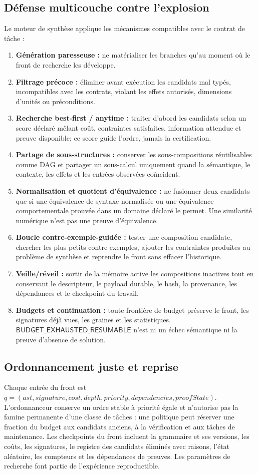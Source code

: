 \documentclass[11pt,a4paper]{article}
\theoremstyle{definition}
\theoremstyle{plain}
\theoremstyle{remark}
\begin{document}
\subsection{Défense multicouche contre l'explosion}
Le moteur de synthèse applique les mécanismes compatibles avec le contrat de tâche :
\begin{enumerate}
\item \textbf{Génération paresseuse :} ne matérialiser les branches qu'au moment où le front de recherche les développe.
\item \textbf{Filtrage précoce :} éliminer avant exécution les candidats mal typés, incompatibles avec les contrats, violant les effets autorisés, dimensions d'unités ou préconditions.
\item \textbf{Recherche best-first / anytime :} traiter d'abord les candidats selon un score déclaré mêlant coût, contraintes satisfaites, information attendue et preuve disponible; ce score guide l'ordre, jamais la certification.
\item \textbf{Partage de sous-structures :} conserver les sous-compositions réutilisables comme DAG et partager un sous-calcul uniquement quand la sémantique, le contexte, les effets et les entrées observées coïncident.
\item \textbf{Normalisation et quotient d'équivalence :} ne fusionner deux candidats que si une équivalence de syntaxe normalisée ou une équivalence comportementale prouvée dans un domaine déclaré le permet. Une similarité numérique n'est pas une preuve d'équivalence.
\item \textbf{Boucle contre-exemple-guidée :} tester une composition candidate, chercher les plus petits contre-exemples, ajouter les contraintes produites au problème de synthèse et reprendre le front sans effacer l'historique.
\item \textbf{Veille/réveil :} sortir de la mémoire active les compositions inactives tout en conservant le descripteur, le payload durable, le hash, la provenance, les dépendances et le checkpoint du travail.
\item \textbf{Budgets et continuation :} toute frontière de budget préserve le front, les signatures déjà vues, les graines et les statistiques. $\mathsf{BUDGET\_EXHAUSTED\_RESUMABLE}$ n'est ni un échec sémantique ni la preuve d'absence de solution.
\end{enumerate}

\subsection{Ordonnancement juste et reprise}
Chaque entrée du front est $q=(ast,signature,cost,depth,priority,dependencies,proofState)$. L'ordonnanceur conserve un ordre stable à priorité égale et n'autorise pas la famine permanente d'une classe de tâches : une politique peut réserver une fraction du budget aux candidats anciens, à la vérification et aux tâches de maintenance. Les checkpoints du front incluent la grammaire et ses versions, les coûts, les signatures, le registre des candidats éliminés avec raisons, l'état aléatoire, les compteurs et les dépendances de preuves. Les paramètres de recherche font partie de l'expérience reproductible.
\end{document}
